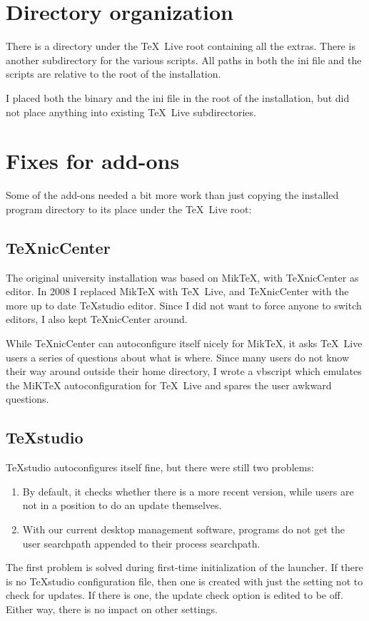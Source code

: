 \documentclass[11pt,a4paper,oneside]{report}
\def\TL{\TeX~Live}
\def\TNC{TeXnicCenter}
\def\TS{TeXstudio}
\begin{document}
\section{Directory organization}
\label{sec:rugdirs}

There is a directory under the \TL{} root containing all the
extras. There is another subdirectory for the various scripts. All
paths in both the ini file and the scripts are relative to the root
of the installation.

I placed both the binary and the ini file in the root of the
installation, but did not place anything into existing \TL{}
subdirectories.

\section{Fixes for add-ons}
\label{sec:fixes}

Some of the add-ons needed a bit more work than just copying the
installed program directory to its place under the \TL{} root:

\subsection{\TNC}
\label{sec:tnc}
The original university installation was based on MikTeX, with
\TNC{} as editor. In 2008 I replaced MikTeX with \TL, and \TNC{}
with the more up to date \TS{} editor. Since I did not want to force
anyone to switch editors, I also kept \TNC{} around.

While \TNC{} can autoconfigure itself nicely for MikTeX, it asks
\TL{} users a series of questions about what is where. Since many
users do not know their way around outside their home directory, I
wrote a vbscript which emulates the MiKTeX autoconfiguration for
\TL{} and spares the user awkward questions.

\subsection{\TS}
\label{sec:ts}

\TS{} autoconfigures itself fine, but there were still two problems:
\begin{enumerate}
\item By default, it checks whether there is a more recent version,
  while users are not in a position to do an update themselves.
\item With our current desktop management software, programs do not
  get the user searchpath appended to their process searchpath.
\end{enumerate}
The first problem is solved during first-time initialization of the
launcher. If there is no \TS{} configuration file, then one is
created with just the setting not to check for updates. If there is
one, the update check option is edited to be off. Either way, there
is no impact on other settings.
\end{document}

